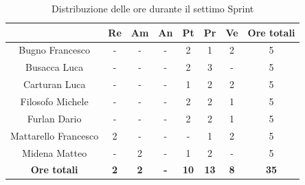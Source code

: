 \begin{table}[H]
  \centering
  \renewcommand{\arraystretch}{1.8}
  \begin{tabular}{c|c|c|c|c|c|c|c}
    \rowcolor[HTML]{125E28}
    \multicolumn{1}{c}{\color[HTML]{FFFFFF}\textbf{ Nominativo }}
                         & \multicolumn{1}{c}{\color[HTML]{FFFFFF}\textbf{ Re }}
                         & \multicolumn{1}{c}{\color[HTML]{FFFFFF}\textbf{ Am}}
                         & \multicolumn{1}{c}{\color[HTML]{FFFFFF}\textbf{ An }}
                         & \multicolumn{1}{c}{\color[HTML]{FFFFFF}\textbf{ Pt }}
                         & \multicolumn{1}{c}{\color[HTML]{FFFFFF}\textbf{ Pr }}
                         & \multicolumn{1}{c}{\color[HTML]{FFFFFF}\textbf{ Ve }}
                         & \multicolumn{1}{c}{\color[HTML]{FFFFFF}\textbf{ Ore totali }}                                                                                  \\
    \hline
    Bugno Francesco      & -                                                             & -          & -          & 2           & 1           & 2          & 5           \\
    Busacca Luca         & -                                                             & -          & -          & 2           & 3           & -          & 5           \\
    Carturan Luca        & -                                                             & -          & -          & 1           & 2           & 2          & 5           \\
    Filosofo Michele     & -                                                             & -          & -          & 2           & 2           & 1          & 5           \\
    Furlan Dario         & -                                                             & -          & -          & 2           & 2           & 1          & 5           \\
    Mattarello Francesco & 2                                                             & -          & -          & -           & 1           & 2          & 5           \\
    Midena Matteo        & -                                                             & 2          & -          & 1           & 2           & -          & 5           \\
    \textbf{Ore totali}  & \textbf{2}                                                    & \textbf{2} & \textbf{-} & \textbf{10} & \textbf{13} & \textbf{8} & \textbf{35}
  \end{tabular}
  \caption{Distribuzione delle ore durante il settimo Sprint}
\end{table}

